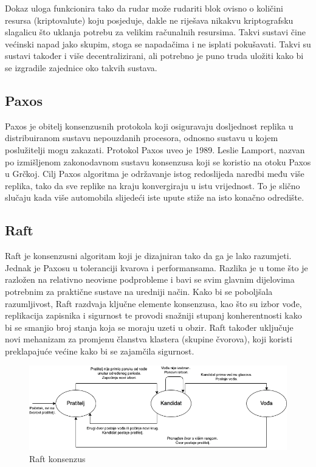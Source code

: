 \documentclass[times, utf8, diplomski]{fer}
\begin{document}
Dokaz uloga funkcionira tako da rudar može rudariti blok ovisno o količini resursa (kriptovalute) koju posjeduje, dakle ne riješava nikakvu kriptografsku slagalicu što uklanja potrebu za velikim računalnih resursima. Takvi sustavi čine većinski napad jako skupim, stoga se napadačima i ne isplati pokušavati. Takvi su sustavi također i više decentralizirani, ali potrebno je puno truda uložiti kako bi se izgradile zajednice oko takvih sustava.

\subsection{Paxos}

Paxos je obitelj konsenzusnih protokola koji osiguravaju dosljednost replika u distribuiranom sustavu nepouzdanih procesora, odnosno sustavu u kojem poslužitelji mogu zakazati. Protokol Paxos uveo je 1989. Leslie Lamport, nazvan po izmišljenom zakonodavnom sustavu konsenzusa koji se koristio na otoku Paxos u Grčkoj. Cilj Paxos algoritma je održavanje istog redoslijeda naredbi među više replika, tako da sve replike na kraju konvergiraju u istu vrijednost. To je slično slučaju kada više automobila slijedeći iste upute stiže na isto konačno odredište. \cite{lamport2001paxos}

\subsection{Raft}
\label{sec:raft}
Raft je konsenzusni algoritam koji je dizajniran tako da ga je lako razumjeti. Jednak je Paxosu u toleranciji kvarova i performansama. Razlika je u tome što je razložen na relativno neovisne podprobleme i bavi se svim glavnim dijelovima potrebnim za praktične sustave na uredniji način. Kako bi se poboljšala razumljivost, Raft razdvaja ključne elemente konsenzusa, kao što su izbor vođe, replikacija zapisnika i sigurnost te provodi snažniji stupanj konherentnosti kako bi se smanjio broj stanja koja se moraju uzeti u obzir. Raft također uključuje novi mehanizam za promjenu članstva klastera (skupine čvorova), koji koristi preklapajuće većine kako bi se zajamčila sigurnost. \cite{raft}

\begin{figure}[htb]
\centering
\includegraphics[width=12cm]{imgs/Raft.png}
\caption{Raft konsenzus}
\label{fig:raft}
\end{figure}
\end{document}
